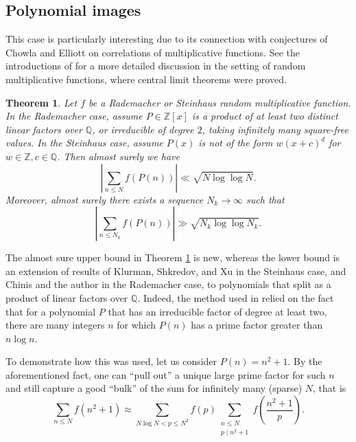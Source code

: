 \documentclass[11pt]{tran-l}
\newtheorem{theoremL}{Theorem}[section]    %
\theoremstyle{definition}
\theoremstyle{remark}
\numberwithin{equation}{section}
\begin{document}
\subsection{Polynomial images} This case is particularly interesting due to its connection with conjectures of Chowla and Elliott \cite{Chowla1965, Elliott1992, Elliott1994} on correlations of multiplicative functions. See the introductions of \cite{KlurmanShkredovXu2023, ChinisShala2025} for a more detailed discussion in the setting of random multiplicative functions, where central limit theorems were proved.

\begin{theoremL}\label{thm:asboundsPoly}
    Let $f$ be a  Rademacher or Steinhaus random multiplicative function. In the Rademacher case, assume $P\in\mathbb Z[x]$ is a product of at least two distinct linear factors over $\mathbb Q$, or irreducible of degree $2$, taking infinitely many square-free values. In the Steinhaus case, assume $P(x)$ is not of the form $w(x+c)^d$ for $w\in\mathbb Z, c\in\mathbb Q$. Then almost surely we have $$\left\lvert\sum_{n\leq N} f(P(n))\right\rvert \ll \sqrt{N\log\log N}.$$ Moreover, almost surely there exists a sequence $N_k\to\infty$ such that 
    \begin{equation*}
        \left\lvert\sum_{n\leq N_k} f(P(n))\right\rvert\gg \sqrt{N_k\log\log N_k}.
    \end{equation*}
\end{theoremL}

The almost sure upper bound in Theorem \ref{thm:asboundsPoly} is new, whereas the lower bound is an extension of results of Klurman, Shkredov, and Xu \cite{KlurmanShkredovXu2023} in the Steinhaus case, and Chinis and the author \cite{ChinisShala2025} in the Rademacher case, to polynomials that split as a product of linear factors over $\mathbb Q$. Indeed, the method used in \cite{KlurmanShkredovXu2023, ChinisShala2025} relied on the fact that for a polynomial $P$ that has an irreducible factor of degree at least two, there are many integers $n$ for which $P(n)$ has a prime factor greater than $n\log n$. 

To demonstrate how this was used, let us consider $P(n) = n^2+1$. By the aforementioned fact, one can ``pull out'' a unique large prime factor for such $n$ and still capture a good ``bulk'' of the sum for infinitely many (sparse) $N$, that is 
\begin{equation*}
    \sum_{n\leq N}f(n^2+1)\approx \sum_{N\log N < p\leq N^2}f(p)\sum_{\substack{n\leq N \\ p\mid n^2+1}}f\left(\frac{n^2+1}{p}\right).
\end{equation*}
\end{document}
